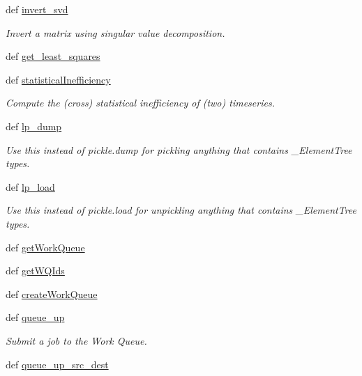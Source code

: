 \begin{DoxyCompactItemize}
def \hyperlink{namespaceforcebalance_1_1nifty_a4c82187e92dfeb8a159f4aa44b501c40}{invert\-\_\-svd}
\begin{DoxyCompactList}\small\item\em Invert a matrix using singular value decomposition. \end{DoxyCompactList}\item 
def \hyperlink{namespaceforcebalance_1_1nifty_aa9fb9c7c65231eca50a7afc04f489b64}{get\-\_\-least\-\_\-squares}
\item 
def \hyperlink{namespaceforcebalance_1_1nifty_ad5ca60565c864b4245a8212fe9d92e10}{statistical\-Inefficiency}
\begin{DoxyCompactList}\small\item\em Compute the (cross) statistical inefficiency of (two) timeseries. \end{DoxyCompactList}\item 
def \hyperlink{namespaceforcebalance_1_1nifty_a2ff762a2f2d2b6bb1c7dd067bd1a1e88}{lp\-\_\-dump}
\begin{DoxyCompactList}\small\item\em Use this instead of pickle.\-dump for pickling anything that contains \-\_\-\-Element\-Tree types. \end{DoxyCompactList}\item 
def \hyperlink{namespaceforcebalance_1_1nifty_a577abfd36638c5f4dfdade136abaef12}{lp\-\_\-load}
\begin{DoxyCompactList}\small\item\em Use this instead of pickle.\-load for unpickling anything that contains \-\_\-\-Element\-Tree types. \end{DoxyCompactList}\item 
def \hyperlink{namespaceforcebalance_1_1nifty_ac37d4fe58ef70ed546ebfc45d12f7a5d}{get\-Work\-Queue}
\item 
def \hyperlink{namespaceforcebalance_1_1nifty_abe1e72c32252d62a6551b47290c7584f}{get\-W\-Q\-Ids}
\item 
def \hyperlink{namespaceforcebalance_1_1nifty_ab5f3072ad95e9c75659cb1adac341051}{create\-Work\-Queue}
\item 
def \hyperlink{namespaceforcebalance_1_1nifty_a673f4a044169f5d8d822823989a836a7}{queue\-\_\-up}
\begin{DoxyCompactList}\small\item\em Submit a job to the Work Queue. \end{DoxyCompactList}\item 
def \hyperlink{namespaceforcebalance_1_1nifty_a5d5abeb4a185fde64721d044831e18ee}{queue\-\_\-up\-\_\-src\-\_\-dest}

\end{DoxyCompactItemize}
